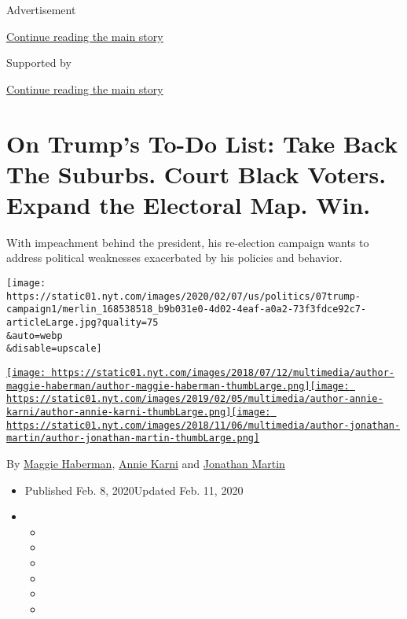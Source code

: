 Advertisement

\protect\hyperlink{after-top}{Continue reading the main story}

Supported by

\protect\hyperlink{after-sponsor}{Continue reading the main story}

\hypertarget{on-trumps-to-do-list-take-back-the-suburbs-court-black-voters-expand-the-electoral-map-win}{%
\section{On Trump's To-Do List: Take Back The Suburbs. Court Black
Voters. Expand the Electoral Map.
Win.}\label{on-trumps-to-do-list-take-back-the-suburbs-court-black-voters-expand-the-electoral-map-win}}

With impeachment behind the president, his re-election campaign wants to
address political weaknesses exacerbated by his policies and behavior.

\texttt{[image: https://static01.nyt.com/images/2020/02/07/us/politics/07trump-campaign1/merlin\_168538518\_b9b031e0-4d02-4eaf-a0a2-73f3fdce92c7-articleLarge.jpg?quality=75\\\&auto=webp\\\&disable=upscale]}

\href{https://www.nytimes.com/by/maggie-haberman}{\texttt{[image: https://static01.nyt.com/images/2018/07/12/multimedia/author-maggie-haberman/author-maggie-haberman-thumbLarge.png]}}\href{https://www.nytimes.com/by/annie-karni}{\texttt{[image: https://static01.nyt.com/images/2019/02/05/multimedia/author-annie-karni/author-annie-karni-thumbLarge.png]}}\href{https://www.nytimes.com/by/jonathan-martin}{\texttt{[image: https://static01.nyt.com/images/2018/11/06/multimedia/author-jonathan-martin/author-jonathan-martin-thumbLarge.png]}}

By \href{https://www.nytimes.com/by/maggie-haberman}{Maggie Haberman},
\href{https://www.nytimes.com/by/annie-karni}{Annie Karni} and
\href{https://www.nytimes.com/by/jonathan-martin}{Jonathan Martin}

\begin{itemize}
\item
  Published Feb. 8, 2020Updated Feb. 11, 2020
\item
  \begin{itemize}
  \item
  \item
  \item
  \item
  \item
  \item
  \end{itemize}
\end{itemize}

